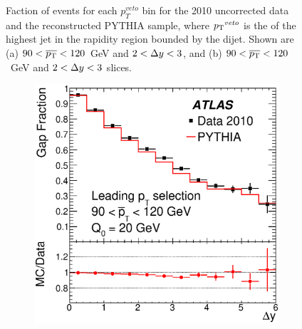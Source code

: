 \begin{figure}
\begin{subfigure}[b]{0.5\textwidth}
        \end{subfigure}%
\caption[Comparison of $p_T^{veto}$ distribution between the data and the reconstructed PYTHIA sample ]{
Faction of events for each $p_T^{veto}$ bin for the 2010 uncorrected data and the reconstructed PYTHIA sample, where $\mbox{$p_{\rm T}$}{}^{veto}$ is the \pt{} of the highest jet in the rapidity region bounded by the dijet. 
Shown are (a) $90<\mbox{$\overline{p_{\rm T}}$}{}<120$~GeV and $2 < \mbox{$\Delta y$}{} <3$, and (b) $90<\mbox{$\overline{p_{\rm T}}$}{}<120$~GeV and $2 < \mbox{$\Delta y$}{} <3$ slices.
\label{Uncorr_Pt3_dy}}
\end{figure}

\begin{figure}
\centering
        \begin{subfigure}[b]{0.5\textwidth}
                \centering
                \includegraphics[width=\textwidth]{figures/GBJ1/UncorrectedData/RatioGF_selA_Ave_pT_90_120.eps}
        \end{subfigure}%
        \begin{subfigure}[b]{0.5\textwidth}
                \centering

\end{subfigure}
\end{figure}
